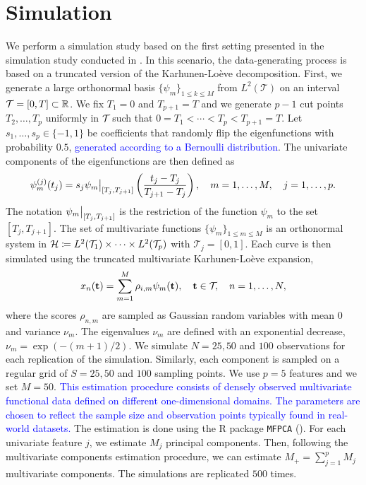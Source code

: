 
\section{Simulation} %
\label{sec:simulation}

We perform a simulation study based on the first setting presented in the simulation study conducted in \cite{happMultivariateFunctionalPrincipal2018}. In this scenario, the data-generating process is based on a truncated version of the Karhunen-Loève decomposition. First, we generate a large orthonormal basis $\{\psi_m\}_{1 \leq k \leq M}$ from $L^{2}(\mathcal{T})$ on an interval $\mathcal{T} = [0, T] \subset \mathbb{R}$. We fix $T_1 = 0$ and $T_{p + 1} = T$ and we generate $p - 1$ cut points $T_2, \dots, T_p$ uniformly in $\mathcal{T}_{}$ such that $0 = T_1 < \cdots < T_p < T_{p+1} = T$. Let $s_1, \dots, s_p \in \{-1, 1\}$ be coefficients that randomly flip the eigenfunctions with probability $0.5$, \textcolor{blue}{generated according to a Bernoulli distribution}. The univariate components of the eigenfunctions are then defined as
\begin{equation}\label{eq:simulation_uni_component}
    \psi_m^{(j)}(t_j) = s_j \restr{\psi_m}{[T_j, T_{j + 1}]}\left(\frac{t_j - T_j}{T_{j + 1} - T_j}\right), \quad m = 1, \dots, M, \quad j = 1, \dots, p.
\end{equation}
The notation $\restr{\psi_m}{[T_j, T_{j + 1}]}$ is the restriction of the function $\psi_m$ to the set $[T_j, T_{j + 1}]$. The set of multivariate functions $\{\psi_m\}_{1 \leq m \leq M}$ is an orthonormal system in $\mathcal{H} \coloneqq L^2({\mathcal{T}_{1}}) \times \dots \times L^2({\mathcal{T}_{p}})$ with $\mathcal{T}_{j} = [0, 1]$. Each curve is then simulated using the truncated multivariate Karhunen-Loève expansion,
\begin{equation}
    x_n(\mathbf{t}) = \sum_{m = 1}^M \rho_{i, m} \psi_m(\mathbf{t}), \quad \mathbf{t} \in \mathcal{T}_{},\quad n = 1, \dots, N,
\end{equation}
where the scores $\rho_{n, m}$ are sampled as Gaussian random variables with mean $0$ and variance $\nu_m$. The eigenvalues $\nu_m$ are defined with an exponential decrease, $\nu_m = \exp(-(m + 1)/2)$. We simulate $N = 25, 50$ and $100$ observations for each replication of the simulation. Similarly, each component is sampled on a regular grid of $S = 25, 50$ and $100$ sampling points. We use $p = 5$ features and we set $M = 50$. \textcolor{blue}{This estimation procedure consists of densely observed multivariate functional data defined on different one-dimensional domains. The parameters are chosen to reflect the sample size and observation points typically found in real-world datasets.} The estimation is done using the \textsf{R} package \texttt{MFPCA} (\cite{happ-kurzObjectOrientedSoftwareFunctional2020}). For each univariate feature $j$, we estimate $M_j$ principal components. Then, following the multivariate components estimation procedure, we can estimate $M_+ = \sum_{j = 1}^p M_j$ multivariate components. The simulations are replicated $500$ times.

